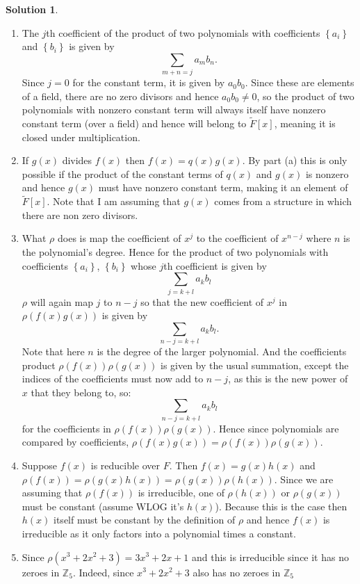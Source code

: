 \documentclass[10pt]{article}
\theoremstyle{definition}
\newtheorem{soln}{Solution}
\newcommand{\ti}[1]{\widetilde{#1}}
\begin{document}
\begin{soln}
  \begin{enumerate}[label=(\alph*)]
    \item The $j$th coefficient of the product of two polynomials with coefficients $\left\{a_i\right\}$ and $\left\{b_i\right\}$ is given by
          $$\sum_{m+n=j}a_mb_n.$$
          Since $j=0$ for the constant term, it is given by $a_0b_0$. Since these are elements of a field, there are no zero divisors and hence $a_0b_0\neq 0$, so
          the product of two polynomials with nonzero constant term will always itself have nonzero constant term (over a field) and hence will belong to $\ti{F}[x]$, meaning it is closed under multiplication.
    \item If $g(x)$ divides $f(x)$ then $f(x)=q(x)g(x)$. By part (a) this is only possible if the product of the constant terms of $q(x)$ and $g(x)$ is nonzero
          and hence $g(x)$ must have nonzero constant term, making it an element of $\ti{F}[x]$. Note that I am assuming that $g(x)$ comes from a structure in which there are non zero divisors.
    \item What $\rho$ does is map the coefficient of $x^j$ to the coefficient of $x^{n-j}$ where $n$ is the polynomial's degree. Hence for the product of two polynomials with coefficients $\left\{a_i\right\}$, $\left\{b_i\right\}$
          whose $j$th coefficient is given by $$\sum_{j=k+l}a_kb_l$$ $\rho$ will again map $j$ to $n-j$ so that the new coefficient of $x^j$ in $\rho(f(x)g(x))$ is given by
          $$\sum_{n-j=k+l}a_kb_l.$$
          Note that here $n$ is the degree of the larger polynomial.
          And the coefficients product
          $\rho(f(x))\rho(g(x))$ is given by the usual summation, except the indices of the coefficients must now add to $n-j$, as this is the new power of $x$ that they belong to, so:
          $$\sum_{n-j=k+l}a_kb_l$$
          for the coefficients in $\rho(f(x))\rho(g(x))$. Hence since polynomials are compared by coefficients, $\rho(f(x)g(x))=\rho(f(x))\rho(g(x))$.
    \item Suppose $f(x)$ is reducible over $F$. Then $f(x)=g(x)h(x)$ and $\rho(f(x))=\rho(g(x)h(x))=\rho(g(x))\rho(h(x))$. Since we are assuming that $\rho(f(x))$ is irreducible,
          one of $\rho(h(x))$ or $\rho(g(x))$ must be constant (assume WLOG it's $h(x)$). Because this is the case then $h(x)$ itself must be constant by the definition of $\rho$ and hence
          $f(x)$ is irreducible as it only factors into a polynomial times a constant.
    \item Since $\rho(x^3+2x^2+3)=3x^3+2x+1$ and this is irreducible since it has no zeroes in $\mathbb{Z}_5$. Indeed, since $x^3+2x^2+3$ also has no zeroes in $\mathbb{Z}_5$

\end{enumerate}
\end{soln}
\end{document}
